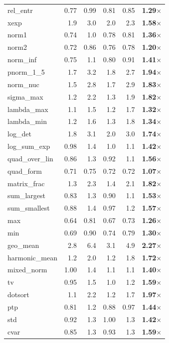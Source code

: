 \documentclass[11pt]{article}
\begin{document}
\begin{center}
\begin{longtable}{lrrrrr}
rel\_entr & 0.77 & 0.99 & 0.81 & 0.85 & \textbf{1.29$\times$} \\
xexp & 1.9 & 3.0 & 2.0 & 2.3 & \textbf{1.58$\times$} \\
norm1 & 0.74 & 1.0 & 0.78 & 0.81 & \textbf{1.36$\times$} \\
norm2 & 0.72 & 0.86 & 0.76 & 0.78 & \textbf{1.20$\times$} \\
norm\_inf & 0.75 & 1.1 & 0.80 & 0.91 & \textbf{1.41$\times$} \\
pnorm\_1\_5 & 1.7 & 3.2 & 1.8 & 2.7 & \textbf{1.94$\times$} \\
norm\_nuc & 1.5 & 2.8 & 1.7 & 2.9 & \textbf{1.83$\times$} \\
sigma\_max & 1.2 & 2.2 & 1.3 & 1.9 & \textbf{1.82$\times$} \\
lambda\_max & 1.1 & 1.5 & 1.2 & 1.7 & \textbf{1.32$\times$} \\
lambda\_min & 1.2 & 1.6 & 1.3 & 1.8 & \textbf{1.34$\times$} \\
log\_det & 1.8 & 3.1 & 2.0 & 3.0 & \textbf{1.74$\times$} \\
log\_sum\_exp & 0.98 & 1.4 & 1.0 & 1.1 & \textbf{1.42$\times$} \\
quad\_over\_lin & 0.86 & 1.3 & 0.92 & 1.1 & \textbf{1.56$\times$} \\
quad\_form & 0.71 & 0.75 & 0.72 & 0.72 & \textbf{1.07$\times$} \\
matrix\_frac & 1.3 & 2.3 & 1.4 & 2.1 & \textbf{1.82$\times$} \\
sum\_largest & 0.83 & 1.3 & 0.90 & 1.1 & \textbf{1.53$\times$} \\
sum\_smallest & 0.88 & 1.4 & 0.97 & 1.2 & \textbf{1.57$\times$} \\
max & 0.64 & 0.81 & 0.67 & 0.73 & \textbf{1.26$\times$} \\
min & 0.69 & 0.90 & 0.74 & 0.79 & \textbf{1.30$\times$} \\
geo\_mean & 2.8 & 6.4 & 3.1 & 4.9 & \textbf{2.27$\times$} \\
harmonic\_mean & 1.2 & 2.0 & 1.2 & 1.8 & \textbf{1.72$\times$} \\
mixed\_norm & 1.00 & 1.4 & 1.1 & 1.1 & \textbf{1.40$\times$} \\
tv & 0.95 & 1.5 & 1.0 & 1.2 & \textbf{1.59$\times$} \\
dotsort & 1.1 & 2.2 & 1.2 & 1.7 & \textbf{1.97$\times$} \\
ptp & 0.81 & 1.2 & 0.88 & 0.97 & \textbf{1.44$\times$} \\
std & 0.92 & 1.3 & 1.00 & 1.3 & \textbf{1.42$\times$} \\
cvar & 0.85 & 1.3 & 0.93 & 1.3 & \textbf{1.59$\times$} \\
\end{longtable}
\end{center}
\end{document}
